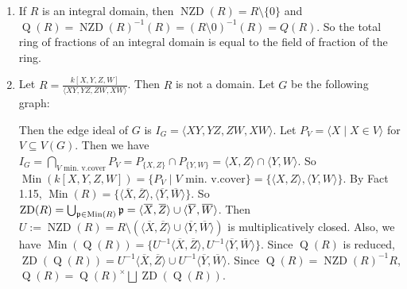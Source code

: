 \begin{example*}
    \begin{enumerate}
        \item If $R$ is an integral domain, then $\operatorname{NZD}(R) = R \setminus \{0\}$ and $\operatorname{Q}(R) = \operatorname{NZD}(R)^{-1}(R) = (R \setminus 0)^{-1}(R) = Q(R)$. So the total ring of fractions of an integral domain is equal to the field of fraction of the ring.
        \item Let $R = \frac{k[X,Y,Z,W]}{\langle XY,YZ,ZW,XW \rangle}$. Then $R$ is not a domain. Let $G$ be the following graph: 
            \begin{center}
            \end{center}
            Then the edge ideal of $G$ is $I_G = \langle XY,YZ,ZW,XW \rangle$. Let $P_V = \langle X \mid X \in V \rangle$ for $V \subseteq V(G)$. Then we have $I_G = \bigcap_{V\text{ min. v.cover}} P_V = P_{\{X,Z\}} \cap P_{\{Y,W\}} =\langle X,Z \rangle \cap \langle Y,W \rangle$. So $\operatorname{Min}(k[X,Y,Z,W]) = \{P_V \mid V\text{ min. v.cover}\} = \{\langle X,Z \rangle, \langle Y,W \rangle\}$. By Fact 1.15, $\operatorname{Min}(R) = \{\langle \overbar{X},\overbar{Z} \rangle, \langle \overbar{Y}, \overbar{W} \rangle\}$. So $\operatorname{ZD}(R) = \bigcup_{\ffp \in \operatorname{Min}(R)}\ffp = \langle \overbar{X}, \overbar{Z} \rangle \cup \langle \overbar{Y}, \overbar{W} \rangle$. Then $U := \operatorname{NZD}(R) = R \setminus (\langle \overbar{X}, \overbar{Z} \rangle \cup \langle \overbar{Y}, \overbar{W} \rangle)$ is multiplicatively closed. Also, we have $\operatorname{Min}(\operatorname{Q}(R)) = \{U^{-1}\langle \overbar{X},\overbar{Z} \rangle, U^{-1}\langle \overbar{Y}, \overbar{W} \rangle\}$. Since $\operatorname{Q}(R)$ is reduced, $\operatorname{ZD}(\operatorname{Q}(R)) = U^{-1} \langle \overbar{X}, \overbar{Z} \rangle \cup U^{-1} \langle \overbar{Y}, \overbar{W} \rangle$. Since $\operatorname{Q}(R) = \operatorname{NZD}(R)^{-1}R$, $\operatorname{Q}(R) = \operatorname{Q}(R)^{\times} \bigsqcup \operatorname{ZD}(\operatorname{Q}(R))$. \par 

\end{enumerate}
\end{example*}
